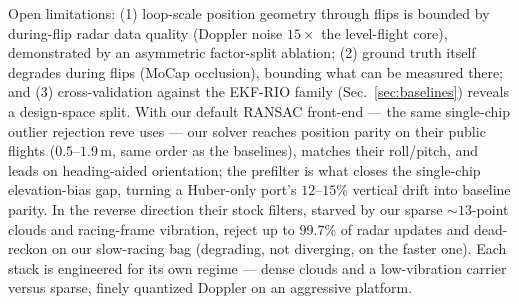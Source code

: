 \documentclass[conference]{IEEEtran}
\begin{document}
Open limitations: (1) loop-scale position geometry through flips is
bounded by during-flip radar data quality (Doppler noise
$15\times$ the level-flight core), demonstrated by an asymmetric
factor-split ablation; (2) ground truth itself degrades during flips
(MoCap occlusion), bounding what can be measured there; and
(3) cross-validation against the EKF-RIO family
(Sec.~\ref{sec:baselines}) reveals a design-space split.  With our
default RANSAC front-end --- the same single-chip outlier rejection
\mbox{reve} uses --- our solver reaches position parity on their public
flights ($0.5$--$1.9$\,m, same order as the baselines), matches their
roll/pitch, and leads on heading-aided orientation; the prefilter is
what closes the single-chip elevation-bias gap, turning a Huber-only
port's $12$--$15\%$ vertical drift into baseline parity.  In the reverse
direction their stock filters, starved by our sparse ${\sim}13$-point
clouds and racing-frame vibration, reject up to 99.7\% of radar updates
and dead-reckon on our slow-racing bag (degrading, not diverging, on the
faster one).  Each stack is engineered for its own regime --- dense
clouds and a low-vibration carrier versus sparse, finely quantized
Doppler on an aggressive platform.



\end{document}
